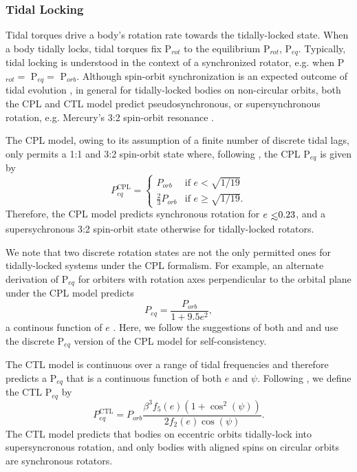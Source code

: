 \documentclass[twocolumn]{aastex61}
\def\lsim{~\rlap{$<$}{\lower 1.0ex\hbox{$\sim$}}}
\begin{document}
\subsubsection{Tidal Locking}

Tidal torques drive a body's rotation rate towards the tidally-locked state. When a body tidally locks, tidal torques fix P$_{rot}$ to the equilibrium P$_{rot}$, P$_{eq}$.  Typically, tidal locking is understood in the context of a synchronized rotator, e.g. when P$_{rot} = $ P$_{eq} = $ P$_{orb}$. Although spin-orbit synchronization is an expected outcome of tidal evolution \citep{Counselman1973}, in general for tidally-locked bodies on non-circular orbits, both the CPL and CTL model predict pseudosynchronous, or supersynchronous rotation, e.g. Mercury's 3:2 spin-orbit resonance \citep[P$_{rot} = 2/3$ P$_{orb}$,][]{GoldreichPeale1966}.   

The CPL model, owing to its assumption of a finite number of discrete tidal lags, only permits a 1:1 and 3:2 spin-orbit state where, following \citet{Barnes2017}, the CPL P$_{eq}$ is given by
\begin{equation} \label{eqn:cpl:eqPer}
P^{\mathrm{CPL}}_{eq} = 
\begin{cases}
P_{orb} & \text{if } e < \sqrt{1/19}\\
\frac{2}{3}P_{orb} & \text{if } e \geq \sqrt{1/19}.
\end{cases}
\end{equation}
Therefore, the CPL model predicts synchronous rotation for $e \lsim 0.23$, and a supersychronous 3:2 spin-orbit state otherwise for tidally-locked rotators.

We note that two discrete rotation states are not the only permitted ones for tidally-locked systems under the CPL formalism. For example, an alternate derivation of P$_{eq}$ for orbiters with rotation axes perpendicular to the orbital plane under the CPL model predicts
\begin{equation} \label{eqn:cpl:eqPerCont}
P_{eq} = \frac{P_{orb}}{1 + 9.5e^2},
\end{equation}
a continous function of $e$ \citep{Goldreich1966b,Murray1999}. Here, we follow the suggestions of both \citet{Barnes2013} and \citet{Barnes2017} and use the discrete P$_{eq}$ version of the CPL model for self-consistency.

The CTL model is continuous over a range of tidal frequencies and therefore predicts a P$_{eq}$ that is a continuous function of both $e$ and $\psi$.  Following \citet{Barnes2017}, we define the CTL P$_{eq}$ by
\begin{equation} \label{eqn:ctl:eqPer}
P^{\mathrm{CTL}}_{eq} = P_{orb} \frac{\beta^3 f_5(e) (1 + \cos^2(\psi))}{2f_2(e) \cos(\psi)}.
\end{equation}
The CTL model predicts that bodies on eccentric orbits tidally-lock into supersyncronous rotation, and only bodies with aligned spins on circular orbits are synchronous rotators. 
\end{document}
